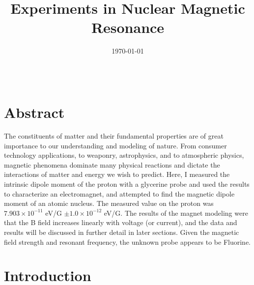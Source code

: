 \documentclass[twocolumn]{article}
\title{Experiments in Nuclear Magnetic Resonance} %
\author{ } %
\date{\today} %
\begin{document}
\maketitle %

\begin{center}
\begin{tabular}{l r}
\end{tabular}
\end{center}

\newcommand{\qel}{electron charge}
\newcommand{\sel}{uncertainty}

\section*{Abstract}

The constituents of matter and their fundamental properties are of great importance to
our understanding and modeling of nature. From consumer technology applications, to weaponry,
astrophysics, and to atmospheric physics, magnetic phenomena dominate many physical reactions
and dictate the interactions of matter and energy we wish to predict. Here, I measured the
intrinsic dipole moment of the proton with a glycerine probe and used the results to characterize an electromagnet,
and attempted to find the magnetic dipole moment of an atomic nucleus. The measured value
on the proton was $7.903 \times 10^{-11}$ eV/G $\pm 1.0 \times 10^{-12}$ eV/G. The results
of the magnet modeling were that the B field increases linearly with voltage (or current), and the data
and results will be discussed in further detail in later sections. Given the magnetic field strength
and resonant frequency, the unknown probe appears to be Fluorine.


\section*{Introduction}
\end{document}
